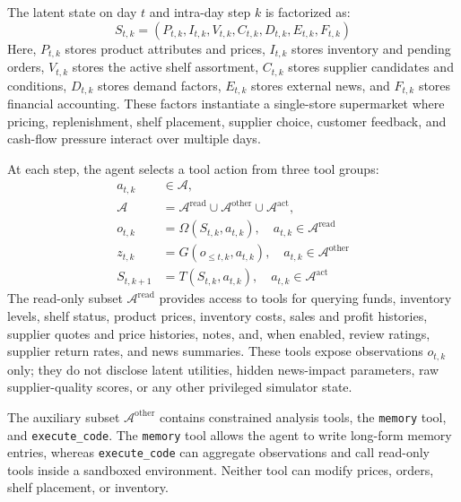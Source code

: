 The latent state on day $t$ and intra-day step $k$ is factorized as:
\begin{equation}
\label{eq:latent_state}
S_{t,k} = (P_{t,k}, I_{t,k}, V_{t,k}, C_{t,k}, D_{t,k}, E_{t,k}, F_{t,k})
\end{equation}
Here, $P_{t,k}$ stores product attributes and prices, $I_{t,k}$ stores inventory and pending orders, $V_{t,k}$ stores the active shelf assortment, $C_{t,k}$ stores supplier candidates and conditions, $D_{t,k}$ stores demand factors, $E_{t,k}$ stores external news, and $F_{t,k}$ stores financial accounting. These factors instantiate a single-store supermarket where pricing, replenishment, shelf placement, supplier choice, customer feedback, and cash-flow pressure interact over multiple days.

At each step, the agent selects a tool action from three tool groups:
\begin{equation}
\label{eq:agent_interaction}
\begin{aligned}
a_{t,k} &\in \mathcal{A},\\
\mathcal{A} &= \mathcal{A}^{\mathrm{read}}
\cup \mathcal{A}^{\mathrm{other}}
\cup \mathcal{A}^{\mathrm{act}},\\
o_{t,k} &= \Omega(S_{t,k},a_{t,k}), \quad a_{t,k}\in\mathcal{A}^{\mathrm{read}}\\
z_{t,k} &= G(o_{\le t,k},a_{t,k}), \quad a_{t,k}\in\mathcal{A}^{\mathrm{other}}\\
S_{t,k+1} &= T(S_{t,k},a_{t,k}), \quad a_{t,k}\in\mathcal{A}^{\mathrm{act}}
\end{aligned}
\end{equation}
The read-only subset $\mathcal{A}^{\mathrm{read}}$ provides access to tools for querying funds, inventory levels, shelf status, product prices, inventory costs, sales and profit histories, supplier quotes and price histories, notes, and, when enabled, review ratings, supplier return rates, and news summaries. These tools expose observations $o_{t,k}$ only; they do not disclose latent utilities, hidden news-impact parameters, raw supplier-quality scores, or any other privileged simulator state.

The auxiliary subset $\mathcal{A}^{\mathrm{other}}$ contains constrained analysis tools, the \texttt{memory} tool, and \texttt{execute\_code}. The \texttt{memory} tool allows the agent to write long-form memory entries, whereas \texttt{execute\_code} can aggregate observations and call read-only tools inside a sandboxed environment. Neither tool can modify prices, orders, shelf placement, or inventory.

